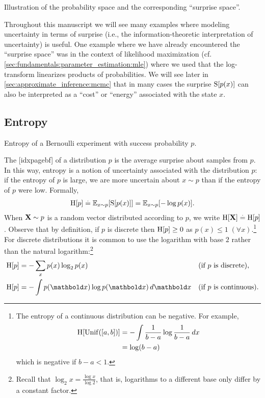 \begin{marginfigure}
  \caption{Illustration of the probability space and the corresponding ``surprise space''.}\label{fig:surprise_space}
\end{marginfigure}

Throughout this manuscript we will see many examples where modeling uncertainty in terms of surprise (i.e., the information-theoretic interpretation of uncertainty) is useful.
One example where we have already encountered the ``surprise space'' was in the context of likelihood maximization (cf. \cref{sec:fundamentals:parameter_estimation:mle}) where we used that the log-transform linearizes products of probabilities.
We will see later in \cref{sec:approximate_inference:mcmc} that in many cases the surprise $\S{p(x)}$ can also be interpreted as a ``cost'' or ``energy'' associated with the state $x$.

\subsection{Entropy}

\begin{marginfigure}[5\baselineskip]
  \caption{Entropy of a Bernoulli experiment with success probability $p$.}
\end{marginfigure}

The [idxpagebf] of a distribution $p$ is the average surprise about samples from $p$.
In this way, entropy is a notion of uncertainty associated with the distribution $p$: if the entropy of $p$ is large, we are more uncertain about $x \sim p$ than if the entropy of $p$ were low.
Formally, \begin{align}
  \H{p} \defeq \E[x \sim p]{\S{p(x)}} = \E[x \sim p]{- \log p(x)}. \label{eq:entropy}
\end{align}
When $\mathbf{X} \sim p$ is a random vector distributed according to $p$, we write $\H{\rX} \defeq \H{p}$.
Observe that by definition, if $p$ is discrete then $\H{p} \geq 0$ as $p(x) \leq 1 \; (\forall x)$.\footnote{The entropy of a continuous distribution can be negative.
For example, \begin{align*}
  \H{\Unif{[a,b]}} &= -\int \frac{1}{b-a} \log\frac{1}{b-a} \,dx \\
  &= \log(b-a)
\end{align*} which is negative if $b-a < 1$.}
For discrete distributions it is common to use the logarithm with base $2$ rather than the natural logarithm:\footnote{Recall that $\log_2 x = \frac{\log x}{\log 2}$, that is, logarithms to a different base only differ by a constant factor.} \begin{subequations}\begin{align}
  \H{p} &= - \sum_{x} p(x) \log_2 p(x) &&\text{(if $p$ is discrete)}, \label{eq:entropy_discrete} \\
  \H{p} &= - \int p(\vx) \log p(\vx) \,d\vx  &&\text{(if $p$ is continuous)}. \label{eq:entropy_cont}
\end{align}\end{subequations}

